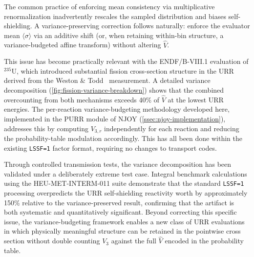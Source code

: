 \documentclass{style/nseJournal}
\newcommand{\isotope}[2]{\ensuremath{^{#1}\mathrm{#2}}}
\newcommand{\sbin}{\langle \sigma \rangle}
\begin{document}
The common practice of enforcing mean consistency via multiplicative renormalization inadvertently rescales the sampled distribution and biases self-shielding. A variance-preserving correction follows naturally: enforce the evaluator mean $\sbin$ via an additive shift (or, when retaining within-bin structure, a variance-budgeted affine transform) without altering $\hat{V}$.

This issue has become practically relevant with the ENDF/B-VIII.1 evaluation of \isotope{235}{U}, which introduced substantial fission cross-section structure in the URR derived from the Weston \& Todd~\cite{WestonTodd1992} measurement. A detailed variance decomposition (\autoref{fig:fission-variance-breakdown}) shows that the combined overcounting from both mechanisms exceeds 40\% of $\hat{V}$ at the lowest URR energies. The per-reaction variance-budgeting methodology developed here, implemented in the PURR module of NJOY (\autoref{ssec:njoy-implementation}), addresses this by computing $V_{3,r}$ independently for each reaction and reducing the probability-table modulation accordingly. This has all been done within the existing \texttt{LSSF=1} factor format, requiring no changes to transport codes.

Through controlled transmission tests, the variance decomposition has been validated under a deliberately extreme test case. Integral benchmark calculations using the HEU-MET-INTERM-011 suite demonstrate that the standard \texttt{LSSF=1} processing overpredicts the URR self-shielding reactivity worth by approximately 150\% relative to the variance-preserved result, confirming that the artifact is both systematic and quantitatively significant. Beyond correcting this specific issue, the variance-budgeting framework enables a new class of URR evaluations in which physically meaningful structure can be retained in the pointwise cross section without double counting $V_3$ against the full $\hat{V}$ encoded in the probability table.




\end{document}
